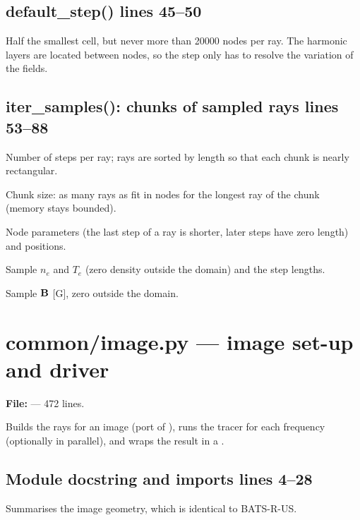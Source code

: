 \section*{\normalsize default\_step() \hfill{\small\mdseries\color{gray}lines 45--50}}

Half the smallest cell, but never more than 20000 nodes per ray. The harmonic layers are located between nodes, so the step only has to resolve the variation of the fields.

\section*{\normalsize iter\_samples(): chunks of sampled rays \hfill{\small\mdseries\color{gray}lines 53--88}}

\begin{lines}
\item[L.64–65] Number of steps per ray; rays are sorted by length so that each chunk is nearly rectangular.
\item[L.68–72] Chunk size: as many rays as fit in  nodes for the longest ray of the chunk (memory stays bounded).
\item[L.75–76] Node parameters (the last step of a ray is shorter, later steps have zero length) and positions.
\item[L.78–82] Sample $n_e$ and $T_e$ (zero density outside the domain) and the step lengths.
\item[L.83–86] Sample $\mathbf{B}$ [G], zero outside the domain.
\end{lines}

\chapter{common/image.py --- image set-up and driver}
\label{mod:common:image.py}
\textbf{File:}  --- 472 lines.

Builds the rays for an image (port of ), runs the tracer for
each frequency (optionally in parallel), and wraps the result in a .

\section*{\normalsize Module docstring and imports \hfill{\small\mdseries\color{gray}lines 4--28}}

Summarises the image geometry, which is identical to BATS-R-US.

